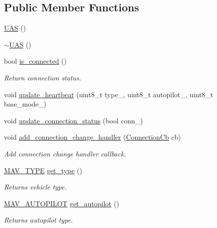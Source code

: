 \subsection*{Public Member Functions}
\begin{DoxyCompactItemize}
\item 
\mbox{\hyperlink{group__nodelib_ga73bb173cfb9914f380671cb0f3efb113}{U\+AS}} ()
\item 
\mbox{\hyperlink{group__nodelib_gab273c619e0a6433f1ea3291103ec3710}{$\sim$\+U\+AS}} ()
\item 
bool \mbox{\hyperlink{group__nodelib_gae5ac050d003fe823d5c483e7f636e91c}{is\+\_\+connected}} ()
\begin{DoxyCompactList}\small\item\em Return connection status. \end{DoxyCompactList}\item 
void \mbox{\hyperlink{group__nodelib_gad353627789d9fa0e4cafb7fb8dad9b32}{update\+\_\+heartbeat}} (uint8\+\_\+t type\+\_\+, uint8\+\_\+t autopilot\+\_\+, uint8\+\_\+t base\+\_\+mode\+\_\+)
\item 
void \mbox{\hyperlink{group__nodelib_ga566ad54aab4ddea1c0e3756870fe9c91}{update\+\_\+connection\+\_\+status}} (bool conn\+\_\+)
\item 
void \mbox{\hyperlink{group__nodelib_gafb66aabf2079888fb4e1a07fcce2161c}{add\+\_\+connection\+\_\+change\+\_\+handler}} (\mbox{\hyperlink{group__nodelib_gae26d7ffaa66c0d7996857ca12600dab5}{Connection\+Cb}} cb)
\begin{DoxyCompactList}\small\item\em Add connection change handler callback. \end{DoxyCompactList}\item 
\mbox{\hyperlink{group__nodelib_ga96b408110c3646b92bef49d32ed1c84b}{M\+A\+V\+\_\+\+T\+Y\+PE}} \mbox{\hyperlink{group__nodelib_gaeac4cd692aff7e67498a1ad01ea95b9f}{get\+\_\+type}} ()
\begin{DoxyCompactList}\small\item\em Returns vehicle type. \end{DoxyCompactList}\item 
\mbox{\hyperlink{group__nodelib_gab6b5a708dff72c3923fd71d8d4730e3e}{M\+A\+V\+\_\+\+A\+U\+T\+O\+P\+I\+L\+OT}} \mbox{\hyperlink{group__nodelib_gad61deec4e10469fc9eb40dcc3a36aab1}{get\+\_\+autopilot}} ()
\begin{DoxyCompactList}\small\item\em Returns autopilot type. \end{DoxyCompactList}\item 

\end{DoxyCompactItemize}
